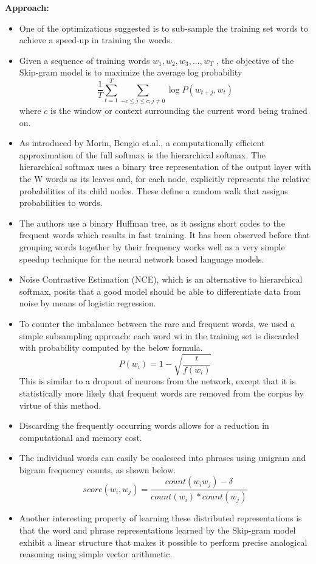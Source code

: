 \documentclass[11pt,a4paper]{article}
\begin{document}
  \textbf{Approach:}
  \begin{itemize}
    \item 
    One of the optimizations suggested is to sub-sample the training set words to achieve a speed-up in training the words.
    \item 
    Given a sequence of training words $w_1 , w_2 , w_3 , . . . , w_T$ , the objective of the Skip-gram model is to maximize the average log probability 
    \begin{equation}
      \frac{1}{T} \sum_{t=1}^T \sum_{-c \leq j \leq c; j \neq 0} \log P(w_{t+j}, w_t)
    \end{equation}
    where $c$ is the window or context surrounding the current word being trained on. 
    \item 
    As introduced by Morin, Bengio et.al.\cite{morin2005hierarchical}, a computationally efficient approximation of the full softmax is the hierarchical softmax. The hierarchical softmax uses a binary tree representation of the output layer with the W words as its leaves and, for each node, explicitly represents the relative probabilities of its child nodes. These define a random walk that assigns probabilities to words.
    \item 
    The authors use a binary Huffman tree, as it assigns short codes to the frequent words which results in fast training. It has been observed before that grouping words together by their frequency works well as a very simple speedup technique for the neural network based language models.
    \item 
    Noise Contrastive Estimation (NCE), which is an alternative to hierarchical softmax,  posits that a good model should be able to differentiate data from noise by means of logistic regression.
    \item 
    To counter the imbalance between the rare and frequent words, we used a simple subsampling approach: each word wi in the training set is discarded with probability computed by the below formula. 
    $$P(w_i) = 1 - \sqrt{\frac{t}{f(w_i)}} $$
    This is similar to a dropout of neurons from the network, except that it is statistically more likely that frequent words are removed from the corpus by virtue of this method.
    \item 
    Discarding the frequently occurring words allows for a reduction in computational and memory cost.
    \item 
    The individual words can easily be coalesced into phrases using unigram and bigram frequency counts, as shown below.
    $$score(w_i, w_j) = \frac{count(w_i w_j) - \delta}{count(w_i) * count(w_j)} $$
    \item 
    Another interesting property of learning these distributed representations is that the word and phrase representations learned by the Skip-gram model exhibit a linear structure that makes it possible to perform precise analogical reasoning using simple vector arithmetic.
  \end{itemize}
\end{document}
